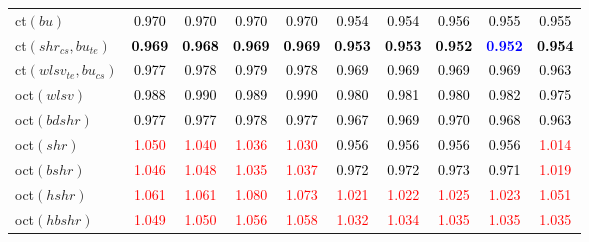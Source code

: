 \begin{tabular}[t]{>{\centering\arraybackslash}m{2.5cm}ccccccccc}
ct$(bu)$ & \textcolor{black}{0.970} & \textcolor{black}{0.970} & \textcolor{black}{0.970} & \textcolor{black}{0.970} & \textcolor{black}{0.954} & \textcolor{black}{0.954} & \textcolor{black}{0.956} & \textcolor{black}{0.955} & \textcolor{black}{0.955}\\
ct$(shr_{cs}, bu_{te})$ & \textcolor{black}{\textbf{0.969}} & \textcolor{black}{\textbf{0.968}} & \textcolor{black}{\textbf{0.969}} & \textcolor{black}{\textbf{0.969}} & \textcolor{black}{\textbf{0.953}} & \textcolor{black}{\textbf{0.953}} & \textcolor{black}{\textbf{0.952}} & \textcolor{blue}{\textbf{0.952}} & \textcolor{black}{\textbf{0.954}}\\
ct$(wlsv_{te}, bu_{cs})$ & \textcolor{black}{0.977} & \textcolor{black}{0.978} & \textcolor{black}{0.979} & \textcolor{black}{0.978} & \textcolor{black}{0.969} & \textcolor{black}{0.969} & \textcolor{black}{0.969} & \textcolor{black}{0.969} & \textcolor{black}{0.963}\\
oct$(wlsv)$ & \textcolor{black}{0.988} & \textcolor{black}{0.990} & \textcolor{black}{0.989} & \textcolor{black}{0.990} & \textcolor{black}{0.980} & \textcolor{black}{0.981} & \textcolor{black}{0.980} & \textcolor{black}{0.982} & \textcolor{black}{0.975}\\
oct$(bdshr)$ & \textcolor{black}{0.977} & \textcolor{black}{0.977} & \textcolor{black}{0.978} & \textcolor{black}{0.977} & \textcolor{black}{0.967} & \textcolor{black}{0.969} & \textcolor{black}{0.970} & \textcolor{black}{0.968} & \textcolor{black}{0.963}\\
oct$(shr)$ & \textcolor{red}{1.050} & \textcolor{red}{1.040} & \textcolor{red}{1.036} & \textcolor{red}{1.030} & \textcolor{black}{0.956} & \textcolor{black}{0.956} & \textcolor{black}{0.956} & \textcolor{black}{0.956} & \textcolor{red}{1.014}\\
oct$(bshr)$ & \textcolor{red}{1.046} & \textcolor{red}{1.048} & \textcolor{red}{1.035} & \textcolor{red}{1.037} & \textcolor{black}{0.972} & \textcolor{black}{0.972} & \textcolor{black}{0.973} & \textcolor{black}{0.971} & \textcolor{red}{1.019}\\
oct$(hshr)$ & \textcolor{red}{1.061} & \textcolor{red}{1.061} & \textcolor{red}{1.080} & \textcolor{red}{1.073} & \textcolor{red}{1.021} & \textcolor{red}{1.022} & \textcolor{red}{1.025} & \textcolor{red}{1.023} & \textcolor{red}{1.051}\\
oct$(hbshr)$ & \textcolor{red}{1.049} & \textcolor{red}{1.050} & \textcolor{red}{1.056} & \textcolor{red}{1.058} & \textcolor{red}{1.032} & \textcolor{red}{1.034} & \textcolor{red}{1.035} & \textcolor{red}{1.035} & \textcolor{red}{1.035}\\

\end{tabular}

